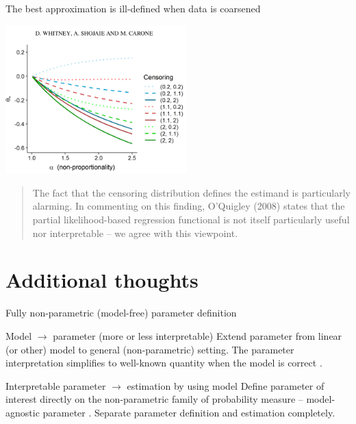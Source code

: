 \documentclass[smaller]{beamer}\usepackage{listings}
\begin{document}
\begin{frame}[label={sec:org840d4da}]{The best approximation is ill-defined when data is coarsened}
\begin{center}
\includegraphics[width=7cm]{./quotes/comment-whitney-figure.png}
\end{center}

\begin{quote} %
\alert{The fact that the censoring distribution defines the estimand is particularly alarming}. In
commenting on this finding, O’Quigley (2008) states that the partial likelihood-based regression
functional is not itself particularly useful nor interpretable -- we agree with this viewpoint.
\citep{whitney2019comment}
\end{quote}
\end{frame}

\section{Additional thoughts}
\label{sec:org84bae79}
\begin{frame}[label={sec:orgd181180}]{Fully non-parametric (model-free) parameter definition}
\begin{block}{Model \(\rightarrow\) parameter (more or less interpretable)}
Extend parameter from linear (or other) model to general (non-parametric) setting. The parameter
interpretation simplifies to well-known quantity when the model is correct
\citep{buja2019models,buja2019models2}.
\end{block}

\begin{block}{Interpretable parameter \(\rightarrow\) estimation by using model}
Define parameter of interest directly on the non-parametric family of probability measure --
model-agnostic parameter \citep{whitney2019comment}. Separate parameter definition and estimation
completely.
\end{block}
\end{frame}
\end{document}
